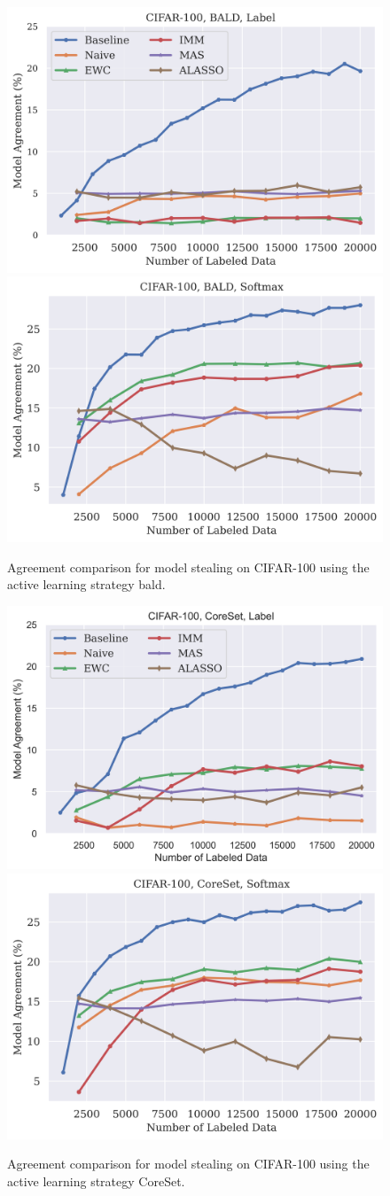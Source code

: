 \begin{figure}[!htb]
    \centering
    \includegraphics[width=0.48\linewidth]{images/results_CALMS/cifar100_label_bald.png} \hfill
    \includegraphics[width=0.48\linewidth]{images/results_CALMS/cifar100_softmax_bald.png}
    \caption{Agreement comparison for model stealing on CIFAR-100 using the active learning strategy \gls{bald}.}
    \label{fig:CALMSCIFAR100BALD}
\end{figure}

\begin{figure}[!htb]
    \centering
    \includegraphics[width=0.48\linewidth]{images/results_CALMS/cifar100_label_coreset.png} \hfill
    \includegraphics[width=0.48\linewidth]{images/results_CALMS/cifar100_softmax_coreset.png}
    \caption{Agreement comparison for model stealing on CIFAR-100 using the active learning strategy CoreSet.}
    \label{fig:CALMSCIFAR100CoreSet}
\end{figure}

